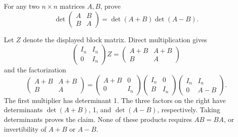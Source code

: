 \begin{problem}\label{ex:05:difference-squares}
For any two \(n\times n\) matrices \(A,B\), prove
\[
\det\begin{pmatrix}A&B\\B&A\end{pmatrix}
=\det(A+B)\det(A-B).
\]
\end{problem}
\begin{solution}
Let \(Z\) denote the displayed block matrix. Direct multiplication gives
\[
\begin{pmatrix}I_n&I_n\\0&I_n\end{pmatrix}Z
=\begin{pmatrix}A+B&A+B\\B&A\end{pmatrix}
\]
and the factorization
\[
\begin{pmatrix}A+B&A+B\\B&A\end{pmatrix}
=\begin{pmatrix}A+B&0\\0&I_n\end{pmatrix}
 \begin{pmatrix}I_n&0\\B&I_n\end{pmatrix}
 \begin{pmatrix}I_n&I_n\\0&A-B\end{pmatrix}.
\]
The first multiplier has determinant 1. The three factors on the right
have determinants \(\det(A+B)\), 1, and \(\det(A-B)\), respectively.
Taking determinants proves the claim. None of these products requires
\(AB=BA\), or invertibility of \(A+B\) or \(A-B\).
\end{solution}

